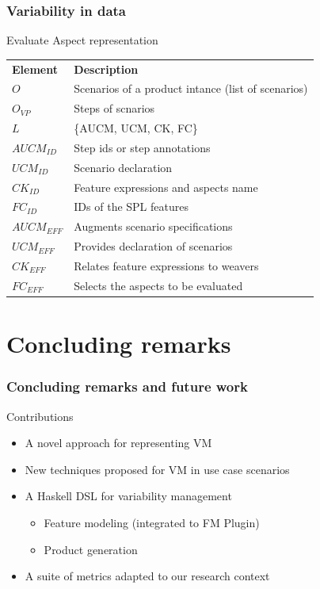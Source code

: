 \documentclass[xcolor=svgnames]{beamer}
\begin{document}
\begin{frame}
\frametitle{Variability in data}
\begin{block}{Evaluate Aspect representation}
\begin{scriptsize}
\begin{tabular}{p{0.6in}p{2.4in}}
   \hline\noalign{\smallskip}
  {\bf Element} & {\bf Description} \\
   \noalign{\smallskip}
   \hline
   \noalign{\smallskip}
   $O$             	& Scenarios of a product intance (list of scenarios) \\
   $O_{VP}$        	& Steps of scnarios \\
   $L$             	& \{AUCM, UCM, CK, FC\} \\
   $AUCM_{ID}$ 		& Step ids or step annotations \\
   $UCM_{ID}$ 		& Scenario declaration \\
   $CK_{ID}$    	& Feature expressions and aspects name\\
   $FC_{ID}$    	& IDs of the SPL features \\
   $AUCM_{EFF}$ 	& Augments scenario specifications	\\
   $UCM_{EFF}$ 		& Provides declaration of scenarios \\
   $CK_{EFF}$    	& Relates feature expressions to weavers \\
   $FC_{EFF}$    	& Selects the aspects to be evaluated \\
   \hline
  \end{tabular}
\end{scriptsize}
\end{block}
\end{frame}

\section{Concluding remarks}

\begin{frame}
\frametitle{Concluding remarks and future work}
\begin{block}{Contributions}
\begin{itemize}
  \item A novel approach for representing VM 
  \item New techniques proposed for VM in use case scenarios
  \item A Haskell DSL for variability management
  \begin{itemize}
    \item Feature modeling (integrated to FM Plugin)
    \item Product generation
  \end{itemize}  
  \item A suite of metrics adapted to our research context
\end{itemize}
\end{block}

\end{frame}
\end{document}
